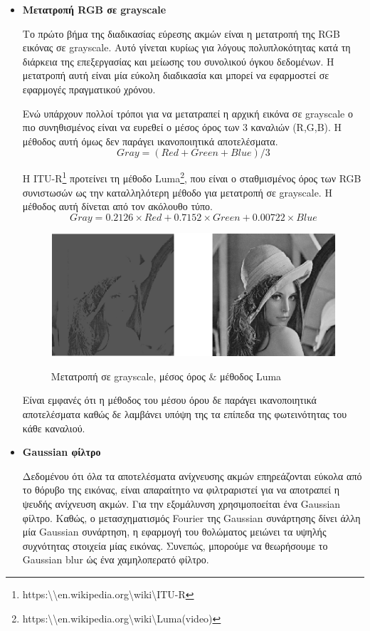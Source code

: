 \begin{itemize}[label={},leftmargin=*]
\item \textbf{Μετατροπή RGB σε grayscale}

Το πρώτο βήμα της διαδικασίας εύρεσης ακμών είναι η μετατροπή της RGB εικόνας σε grayscale. Αυτό γίνεται κυρίως για λόγους πολυπλοκότητας κατά τη διάρκεια της επεξεργασίας και μείωσης του συνολικού όγκου δεδομένων. Η μετατροπή αυτή είναι μία εύκολη διαδικασία και μπορεί να εφαρμοστεί σε εφαρμογές πραγματικού χρόνου.

Ενώ υπάρχουν πολλοί τρόποι για να μετατραπεί η αρχική εικόνα σε grayscale ο πιο συνηθισμένος είναι να ευρεθεί ο μέσος όρος των 3 καναλιών (R,G,B). Η μέθοδος αυτή όμως δεν παράγει ικανοποιητικά αποτελέσματα.
\[Gray = (Red + Green + Blue) / 3\]

H ITU-R\footnote{https:\textbackslash\textbackslash en.wikipedia.org\textbackslash wiki\textbackslash ITU-R} προτείνει τη μέθοδο Luma\footnote{https:\textbackslash\textbackslash en.wikipedia.org\textbackslash wiki\textbackslash Luma\textunderscore (video)}, που είναι ο σταθμισμένος όρος των RGB συνιστωσών ως την καταλληλότερη μέθοδο για μετατροπή σε grayscale. Η μέθοδος αυτή δίνεται από τον ακόλουθο τύπο.
\[Gray = 0.2126\times Red + 0.7152\times Green + 0.00722\times Blue\]
\begin{figure}[H]
   \centering
   \includegraphics[width=\textwidth]{images/gray}\\
   \caption{Μετατροπή σε grayscale, μέσος όρος \& μέθοδος Luma}
\end{figure}

Είναι εμφανές ότι η μέθοδος του μέσου όρου δε παράγει ικανοποιητικά αποτελέσματα καθώς δε λαμβάνει υπόψη της τα επίπεδα της φωτεινότητας του κάθε καναλιού. \\
\hfill \break
\item \textbf{Gaussian φίλτρο}

Δεδομένου ότι όλα τα αποτελέσματα ανίχνευσης ακμών επηρεάζονται εύκολα από το θόρυβο της εικόνας, είναι απαραίτητο να φιλτραριστεί για να αποτραπεί η ψευδής ανίχνευση ακμών. Για την εξομάλυνση χρησιμοποείται ένα Gaussian φίλτρο. Καθώς, ο μετασχηματισμός Fourier της Gaussian συνάρτησης δίνει άλλη μία Gaussian συνάρτηση, η εφαρμογή του θολώματος μειώνει τα υψηλής συχνότητας στοιχεία μίας εικόνας. Συνεπώς, μπορούμε να θεωρήσουμε το Gaussian blur ώς ένα χαμηλοπερατό φίλτρο.


\end{itemize}
